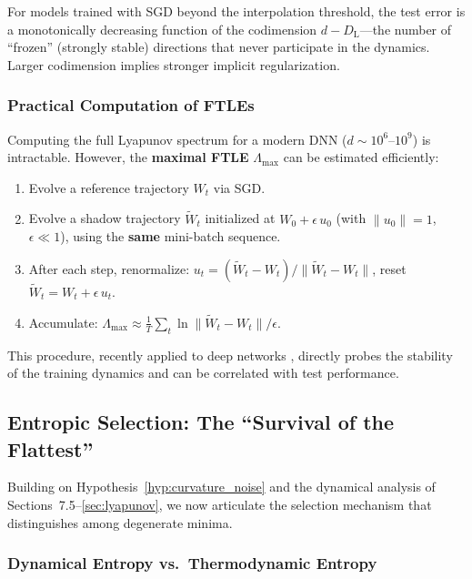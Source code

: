 \documentclass[
  journal=largetwo,
  year=2025,
  volume=37,
]{cup-journal}
\begin{document}
\begin{conjecture}\label{conj:lyap_gen}
    For models trained with SGD beyond the interpolation threshold, the test error is a monotonically decreasing function of the codimension $d - D_{\mathrm{L}}$---the number of ``frozen'' (strongly stable) directions that never participate in the dynamics. Larger codimension implies stronger implicit regularization.
\end{conjecture}

\subsubsection{Practical Computation of FTLEs}

Computing the full Lyapunov spectrum for a modern DNN ($d \sim 10^6$--$10^9$) is intractable. However, the \textbf{maximal FTLE} $\Lambda_{\max}$ can be estimated efficiently:
\begin{enumerate}
    \item Evolve a reference trajectory $W_t$ via SGD.
    \item Evolve a shadow trajectory $\tilde{W}_t$ initialized at $W_0 + \epsilon \, u_0$ (with $\|u_0\| = 1$, $\epsilon \ll 1$), using the \textbf{same} mini-batch sequence.
    \item After each step, renormalize: $u_t = (\tilde{W}_t - W_t) / \|\tilde{W}_t - W_t\|$, reset $\tilde{W}_t = W_t + \epsilon \, u_t$.
    \item Accumulate: $\Lambda_{\max} \approx \frac{1}{T}\sum_{t} \ln \|\tilde{W}_t - W_t\| / \epsilon$.
\end{enumerate}
This procedure, recently applied to deep networks \cite{cohen2021gradient}, directly probes the stability of the training dynamics and can be correlated with test performance.

\subsection{Entropic Selection: The ``Survival of the Flattest''}\label{sec:entropic}

Building on Hypothesis~\ref{hyp:curvature_noise} and the dynamical analysis of Sections~7.5--\ref{sec:lyapunov}, we now articulate the selection mechanism that distinguishes among degenerate minima.

\subsubsection{Dynamical Entropy vs.\ Thermodynamic Entropy}
\end{document}
